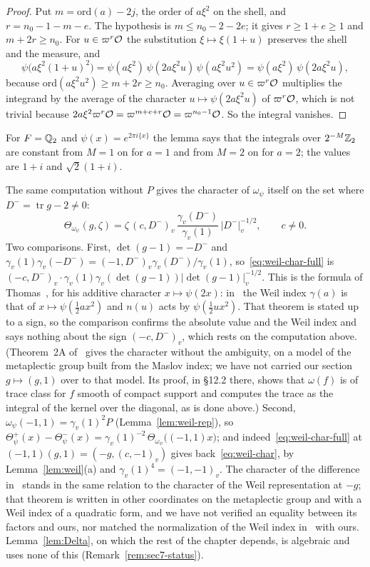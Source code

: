 \begin{proof}
Put $m=\mathrm{ord}(a)-2j$, the order of $a\xi^2$ on the shell, and
$r=n_0-1-m-e$. The hypothesis is $m\le n_0-2-2e$; it gives $r\ge1+e\ge1$
and $m+2r\ge n_0$. For $u\in\varpi^r\mathcal{O}$ the substitution
$\xi\mapsto\xi(1+u)$ preserves the shell and the measure, and
\[
\psi\bigl(a\xi^2(1+u)^2\bigr)=\psi(a\xi^2)\,\psi(2a\xi^2u)\,\psi(a\xi^2u^2)
=\psi(a\xi^2)\,\psi(2a\xi^2u),
\]
because $\mathrm{ord}(a\xi^2u^2)\ge m+2r\ge n_0$. Averaging over
$u\in\varpi^r\mathcal{O}$ multiplies the integrand by the average of the character
$u\mapsto\psi(2a\xi^2u)$ of $\varpi^r\mathcal{O}$, which is not trivial because
$2a\xi^2\varpi^r\mathcal{O}=\varpi^{m+e+r}\mathcal{O}=\varpi^{n_0-1}\mathcal{O}$. So the integral
vanishes.
\end{proof}

For $F=\mathbb{Q}_2$ and $\psi(x)=e^{2\pi i\{x\}}$ the lemma says that the
integrals over $2^{-M}\mathbb{Z}_2$ are constant from $M=1$ on for $a=1$ and from
$M=2$ on for $a=2$; the values are $1+i$ and $\sqrt2(1+i)$.

The same computation without $P$ gives the character of $\omega_\psi$
itself on the set where $D^-=\operatorname{tr}g-2\ne0$:
\begin{equation}\label{eq:weil-char-full}
\Theta_{\omega_\psi}(g,\zeta)=\zeta\,(c,D^-)_v\,\frac{\gamma_v(D^-)}
{\gamma_v(1)}\,|D^-|_v^{-1/2},\qquad c\ne0 .
\end{equation}
Two comparisons. First, $\det(g-1)=-D^-$ and $\gamma_v(1)\gamma_v(-D^-)=
(-1,D^-)_v\gamma_v(D^-)/\gamma_v(1)$, so~\eqref{eq:weil-char-full} is
$(-c,D^-)_v\cdot\gamma_v(1)\gamma_v(\det(g-1))|\det(g-1)|_v^{-1/2}$. This is
the formula of Thomas~\cite[Theorem~1C]{Th08}, for his additive character
$x\mapsto\psi(2x)$: in~\cite{Th08} the Weil index $\gamma(a)$ is that of
$x\mapsto\psi(\frac12ax^2)$ and $n(u)$ acts by $\psi(\frac12ux^2)$. That
theorem is stated up
to a sign, so the comparison confirms the absolute value and the Weil
index and says nothing about the sign $(-c,D^-)_v$, which rests on the
computation above. (Theorem~2A of~\cite{Th08} gives the character without
the ambiguity, on a model of the metaplectic group built from the Maslov
index; we have not carried our section $g\mapsto(g,1)$ over to that
model. Its proof, in \S12.2 there, shows that $\omega(f)$ is of trace
class for $f$ smooth of compact support and computes the trace as the
integral of the kernel over the diagonal, as is done above.) Second,
$\omega_\psi(-1,1)=\gamma_v(1)^2P$ (Lemma~\ref{lem:weil-rep}), so
$\Theta^+_\psi(x)-\Theta^-_\psi(x)=\gamma_v(1)^{-2}\,\Theta_{\omega_\psi}
\bigl((-1,1)x\bigr)$; and indeed~\eqref{eq:weil-char-full} at
$(-1,1)(g,1)=(-g,(c,-1)_v)$ gives back~\eqref{eq:weil-char}, by
Lemma~\ref{lem:weil}(a) and $\gamma_v(1)^4=(-1,-1)_v$. The character of the
difference in~\cite[Theorem~D]{Th13} stands in the same relation to the
character of the Weil representation at $-g$; that theorem is written in
other coordinates on the metaplectic group and with a Weil index of a
quadratic form, and we have not verified an equality between its factors
and ours, nor matched the normalization of the Weil index
in~\cite{Th13} with ours. Lemma~\ref{lem:Delta}, on which
the rest of the chapter depends, is algebraic and uses none of this
(Remark~\ref{rem:sec7-status}).

